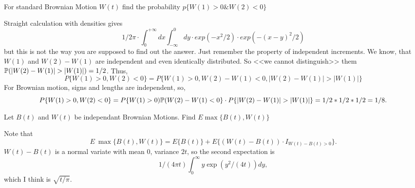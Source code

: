 \begin{problem}
For standard Brownian Motion $W(t)$ find the probability $p \{ W(1)>0 \& W(2)<0 \}$


\begin{sol}
Straight calculation with densities gives
$$
  1/2\pi \cdot \int_0^{+\infty}{dx} \int_{-\infty}^0 dy \cdot exp(-x^2/2) \cdot exp(-(x-y)^2/2)
$$
but this is not the way you are supposed to find out the answer.
Just remember the property of independent increments.
We know, that $W(1)$ and $W(2)-W(1)$ are independent and even identically distributed.
So <<we cannot distinguish>>  them $\P( |W(2)-W(1)| > |W(1)| ) = 1/2$. Thus,
$$
  P\{ W(1)>0, W(2)<0 \} = P\{ W(1)>0, W(2)-W(1) < 0, |W(2)-W(1)| > |W(1)| \}
$$
For Brownian motion, signs and lengths are independent, so,
$$
  P\{ W(1)>0, W(2)<0 \} = P\{ W(1)>0) \P(W(2)-W(1) < 0\} \cdot P\{|W(2)-W(1)| > |W(1)|\} = 1/2*1/2*1/2=1/8.
$$
\end{sol}
\end{problem}

\begin{problem}
Let $B(t)$ and $W(t)$ be independant Brownian Motions. Find $E\max\{B(t),W(t)\}$


\begin{sol}
Note that
$$
  E\ \max\{B(t),W(t)\} =  E \{B(t)\} + E\{(W(t) - B(t))\cdot I_{W(t) - B(t) >0}\}.
$$
$W(t) - B(t)$ is a normal variate with mean $0$, variance $2t$, so the second expectation is
$$
  1/(4\pi t)\int_0^\infty y \exp(y^2/(4t))dy,
$$
which I think is $\sqrt{t/\pi}$.
\end{sol}
\end{problem}

